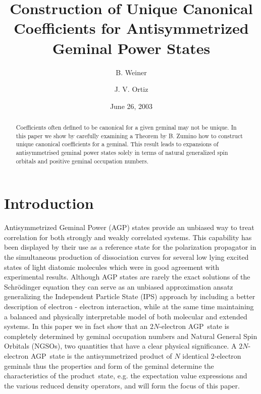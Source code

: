 \documentclass[aps,preprint]{revtex4}%
\begin{document}
\preprint{ }
\title[Antisym. Mat]{Construction of Unique Canonical Coefficients for Antisymmetrized Geminal
Power States}
\author{B. Weiner}
\author{J. V. Ortiz}
\pacs{}

\begin{abstract}
Coefficients often defined to be canonical for a given geminal may not be
unique. In this paper we show by carefully examining a Theorem by B. Zumino
how to construct unique canonical coefficients for a geminal. This result
leads to expansions of antisymmetrised geminal power states solely in terms of
natural generalized spin orbitals and positive geminal occupation numbers.

\end{abstract}
\date{June 26, 2003}
\maketitle
\tableofcontents


\section{Introduction\label{intro}}

Antisymmetrized Geminal Power (AGP) states provide an unbiased way to treat
correlation for both strongly and weakly correlated systems. This capability
has been displayed by their use as a reference state for the polarization
propagator \cite{weiner87}\cite{Weiner85}\cite{Weiner84a}\cite{Kurtz83}%
\cite{Jorgen83} in the simultaneous production of dissociation curves for
several low lying excited states of light diatomic molecules which were in
good agreement with experimental results. Although AGP states are rarely the
exact solutions of the Schr\"{o}dinger equation they can serve as an unbiased
approximation ansatz generalizing the Independent Particle State (IPS)
approach by including a better description of electron - electron interaction,
while at the same time maintaining a balanced and physically interpretable
model of both molecular and extended systems. In this paper we in fact show
that an $2N$-electron AGP\ state is completely determined by geminal
occupation numbers and Natural General Spin Orbitals (NGSOs), two quantities
that have a clear physical significance. A $2N$-electron AGP\ state is the
antisymmetrized product of $N$ identical $2$-electron geminals thus the
properties and form of the geminal determine the characteristics of the
product\ state, e.g. the expectation value expressions and the various reduced
density operators, and will form the focus of this paper.
\end{document}
